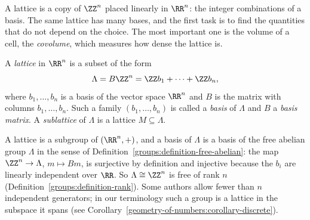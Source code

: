 A lattice is a copy of $\ZZ^n$ placed linearly in $\RR^n$: the integer combinations of a basis. The same lattice has many bases, and the first task is to find the quantities that do not depend
on the choice. The most important one is the volume of a cell, the \emph{covolume}, which measures how dense the lattice is.

\begin{definition}\label{geometry-of-numbers:definition-lattice}
A \emph{lattice} in $\RR^n$ is a subset of the form
\[
\Lambda = B\ZZ^n = \ZZ b_1 + \cdots + \ZZ b_n,
\]
where $b_1, \ldots, b_n$ is a basis of the vector space $\RR^n$ and $B$ is the matrix with columns $b_1, \ldots, b_n$. Such a family $(b_1, \ldots, b_n)$ is called a \emph{basis} of $\Lambda$ and $B$
a \emph{basis matrix}. A \emph{sublattice} of $\Lambda$ is a lattice $M \subseteq \Lambda$.
\end{definition}

A lattice is a subgroup of $(\RR^n, +)$, and a basis of $\Lambda$ is a basis of the free abelian group $\Lambda$ in the sense of Definition~\ref{groups:definition-free-abelian}: the map
$\ZZ^n \to \Lambda$, $m \mapsto Bm$, is surjective by definition and injective because the $b_i$ are linearly independent over $\RR$. So $\Lambda \cong \ZZ^n$ is free of rank $n$
(Definition~\ref{groups:definition-rank}). Some authors allow fewer than $n$ independent generators; in our terminology such a group is a lattice in the subspace it spans (see
Corollary~\ref{geometry-of-numbers:corollary-discrete}).


